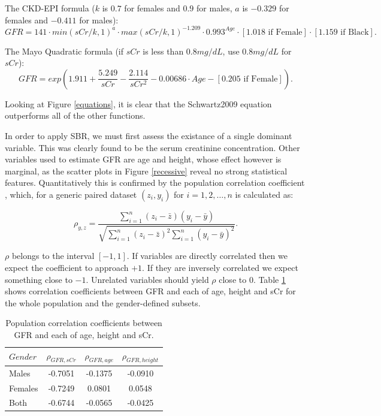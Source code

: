 \documentclass[10pt,final]{siamltex}
\begin{document}
The CKD-EPI formula \cite{ckdepi} ($k$ is $0.7$ for females and $0.9$ for males, $a$ is $−0.329$ for females and $−0.411$ for males):
$$ GFR = 141 \cdot min(sCr/k,1)^a\cdot max(sCr/k,1)^{-1.209}\cdot0.993^{Age}\cdot [1.018 \text{ if Female}] \cdot [1.159 \text{ if Black}].$$

The Mayo Quadratic formula \cite{mayo} (if $sCr$ is less than $0.8 mg/dL$, use $0.8 mg/dL$ for $sCr$):
$$ GFR = exp(1.911+\frac{5.249}{sCr}-\frac{2.114}{sCr^2}-0.00686\cdot Age - [0.205 \text{ if Female}]).$$

Looking at Figure \ref{equations}, it is clear that the Schwartz2009 equation outperforms all of the other functions.

In order to apply SBR, we must first assess the existance of a single dominant variable. This was clearly found to be the serum creatinine concentration. Other variables used to estimate GFR are age and height, whose effect however is marginal, as the scatter plots in Figure \ref{recessive} reveal no strong statistical features. Quantitatively this is confirmed by the population correlation coefficient \cite{mukaka}, which, for a generic paired dataset $(z_i, y_i)$ for $i = 1, 2, \ldots, n$ is calculated as:

$$ \rho_{y,z} = \frac{\sum_{i = 1}^n{(z_i-\bar{z})(y_i-\bar{y})}}
{\sqrt{\sum_{i=1}^n{(z_i-\bar{z})^2}\sum_{i=1}^n{(y_i-\bar{y})^2}}}.$$

$\rho$ belongs to the interval $[-1,1]$. If variables are directly correlated then we expect the coefficient to approach $+1$. If they are inversely correlated we expect something close to $-1$. Unrelated variables should yield $\rho$ close to $0$. Table \ref{corr} shows correlation coefficients between GFR and each of age, height and sCr for the whole population and the gender-defined subsets.

\begin{table}[ht]
  \centering
  \begin{tabular}{|l|c|c|c|}
    \hline
    $Gender$&$\rho_{GFR,sCr}$&$\rho_{GFR,age}$&$\rho_{GFR,height}$\\
    \hline
    Males     & -0.7051 & -0.1375 & -0.0910  \\
    \hline
    Females   & -0.7249 &  0.0801 &  0.0548  \\
    \hline
    Both      & -0.6744 & -0.0565 & -0.0425  \\
    \hline
  \end{tabular}
  \caption{Population correlation coefficients between GFR and each of age, height and sCr.}
  \label{corr}
\end{table}
\end{document}
